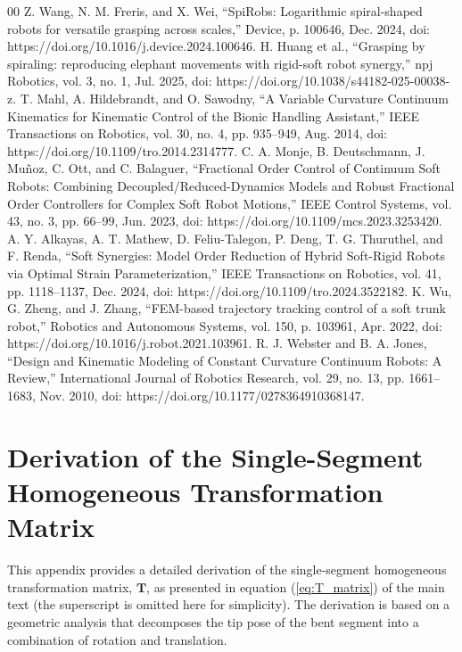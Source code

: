 \documentclass[conference]{IEEEtran}
\begin{document}
\begin{thebibliography}{00}
 Z. Wang, N. M. Freris, and X. Wei, “SpiRobs: Logarithmic spiral-shaped robots for versatile grasping across scales,” Device, p. 100646, Dec. 2024, doi: https://doi.org/10.1016/j.device.2024.100646. 
 H. Huang et al., “Grasping by spiraling: reproducing elephant movements with rigid-soft robot synergy,” npj Robotics, vol. 3, no. 1, Jul. 2025, doi: https://doi.org/10.1038/s44182-025-00038-z.
 T. Mahl, A. Hildebrandt, and O. Sawodny, “A Variable Curvature Continuum Kinematics for Kinematic Control of the Bionic Handling Assistant,” IEEE Transactions on Robotics, vol. 30, no. 4, pp. 935–949, Aug. 2014, doi: https://doi.org/10.1109/tro.2014.2314777.
 C. A. Monje, B. Deutschmann, J. Muñoz, C. Ott, and C. Balaguer, “Fractional Order Control of Continuum Soft Robots: Combining Decoupled/Reduced-Dynamics Models and Robust Fractional Order Controllers for Complex Soft Robot Motions,” IEEE Control Systems, vol. 43, no. 3, pp. 66–99, Jun. 2023, doi: https://doi.org/10.1109/mcs.2023.3253420.
 A. Y. Alkayas, A. T. Mathew, D. Feliu-Talegon, P. Deng, T. G. Thuruthel, and F. Renda, “Soft Synergies: Model Order Reduction of Hybrid Soft-Rigid Robots via Optimal Strain Parameterization,” IEEE Transactions on Robotics, vol. 41, pp. 1118–1137, Dec. 2024, doi: https://doi.org/10.1109/tro.2024.3522182.
 K. Wu, G. Zheng, and J. Zhang, “FEM-based trajectory tracking control of a soft trunk robot,” Robotics and Autonomous Systems, vol. 150, p. 103961, Apr. 2022, doi: https://doi.org/10.1016/j.robot.2021.103961.
 R. J. Webster and B. A. Jones, “Design and Kinematic Modeling of Constant Curvature Continuum Robots: A Review,” International Journal of Robotics Research, vol. 29, no. 13, pp. 1661–1683, Nov. 2010, doi: https://doi.org/10.1177/0278364910368147.
\end{thebibliography}

\clearpage
\onecolumn

\appendices

\section{Derivation of the Single-Segment Homogeneous Transformation Matrix}
This appendix provides a detailed derivation of the single-segment homogeneous transformation matrix, $\mathbf{T}$, as presented in equation (\ref{eq:T_matrix}) of the main text (the superscript is omitted here for simplicity). The derivation is based on a geometric analysis that decomposes the tip pose of the bent segment into a combination of rotation and translation.
\end{document}
